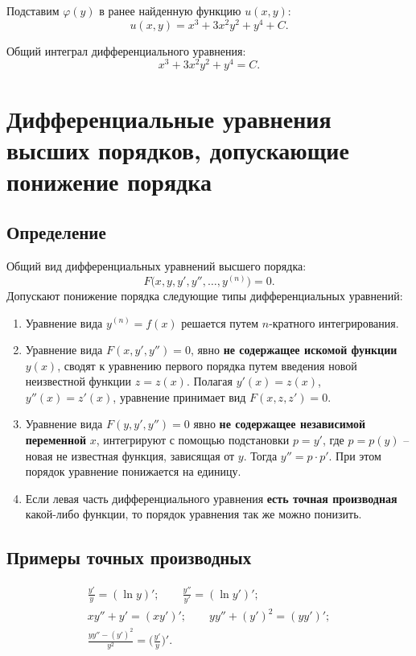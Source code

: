 \documentclass[a5paper, 11pt]{extbook}
\theoremstyle{definition}
\theoremstyle{definition}
\begin{document}
Подставим \(\varphi(y)\) в ранее найденную функцию \(u(x, y)\):
\[
    u(x, y) = x^3 + 3x^2y^2 + y^4 + C.
\]

Общий интеграл дифференциального уравнения:
\[
    x^3 + 3x^2y^2 + y^4 = C.
\]

\section{Дифференциальные уравнения высших порядков, допускающие понижение порядка}

\subsection{Определение}

Общий вид дифференциальных уравнений высшего порядка:
\[
    F \Big( x, y, y', y'', \ldots, y^{(n)} \Big) = 0.
\]
Допускают понижение порядка следующие типы дифференциальных уравнений:
\begin{enumerate}
    \item Уравнение вида \(y^{(n)} = f(x)\) решается путем \(n\)-кратного интегрирования.
    \item Уравнение вида \(F(x, y', y'') = 0\), явно \textbf{не содержащее искомой функции} \(y(x)\), сводят к уравнению первого порядка путем введения новой неизвестной функции \(z = z(x)\). Полагая \(y'(x) = z(x)\), \(y''(x) = z'(x)\), уравнение принимает вид \(F(x, z, z') = 0\).
    \item Уравнение вида \(F(y, y', y'') = 0\) явно \textbf{не содержащее независимой переменной} \(x\), интегрируют с помощью подстановки \(p = y'\), где \(p = p(y)\) -- новая не известная функция, зависящая от \(y\). Тогда \(y'' = p \cdot p'\). При этом порядок уравнение понижается на единицу.
    \item Если левая часть дифференциального уравнения \textbf{есть точная производная} какой-либо функции, то порядок уравнения так же можно понизить.
\end{enumerate}

\subsection{Примеры точных производных}

\begin{gather*}
    \frac{y'}{y} = (\ln y)';
    \qquad
    \frac{y''}{y'} = (\ln y')';
    \\
    xy'' + y' = (xy')';
    \qquad
    yy'' + (y')^2 = (yy')';
    \\
    \frac{yy'' - (y')^2}{y^2} = \Big( \frac{y'}{y} \Big)'.
\end{gather*}
\end{document}
